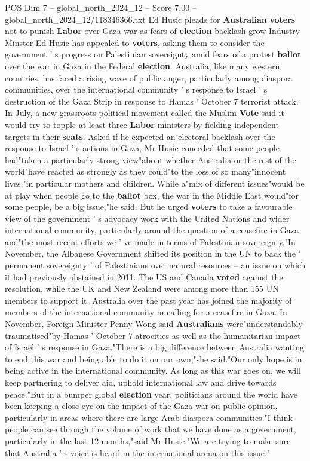 \begin{textsample}{POS Dim 7 – global\_north\_2024\_12 – Score 7.00 – global\_north\_2024\_12/118346366.txt}  \label{ex:f7_pos_290}
Ed Husic pleads for \textbf{Australian} \textbf{voters} not to punish \textbf{Labor} over Gaza war as fears of \textbf{election} backlash grow Industry Minster Ed Husic has appealed to \textbf{voters}, asking them to consider the government ' s progress on Palestinian sovereignty amid fears of a protest \textbf{ballot} over the war in Gaza in the Federal \textbf{election}.
Australia, like many western countries, has faced a rising wave of public anger, particularly among diaspora communities, over the international community ' s response to Israel ' s destruction of the Gaza Strip in response to Hamas ' October 7 terrorist attack.
In July, a new grassroots political movement called the Muslim \textbf{Vote} said it would try to topple at least three \textbf{Labor} ministers by fielding independent targets in their \textbf{seats}.
Asked if he expected an electoral backlash over the response to Israel ' s actions in Gaza, Mr Husic conceded that some people had"taken a particularly strong view"about whether Australia or the rest of the world"have reacted as strongly as they could"to the loss of so many"innocent lives,"in particular mothers and children.
While a"mix of different issues"would be at play when people go to the \textbf{ballot} box, the war in the Middle East would"for some people, be a big issue,"he said.
But he urged \textbf{voters} to take a favourable view of the government ' s advocacy work with the United Nations and wider international community, particularly around the question of a ceasefire in Gaza and"the most recent efforts we ' ve made in terms of Palestinian sovereignty."In November, the Albanese Government shifted its position in the UN to back the ' permanent sovereignty ' of Palestinians over natural resources -- an issue on which it had previously abstained in 2011.
The US and Canada \textbf{voted} against the resolution, while the UK and New Zealand were among more than 155 UN members to support it.
Australia over the past year has joined the majority of members of the international community in calling for a ceasefire in Gaza.
In November, Foreign Minister Penny Wong said \textbf{Australians} were"understandably traumatised"by Hamas ' October 7 atrocities as well as the humanitarian impact of Israel ' s response in Gaza."There is a big difference between Australia wanting to end this war and being able to do it on our own,"she said."Our only hope is in being active in the international community.
As long as this war goes on, we will keep partnering to deliver aid, uphold international law and drive towards peace."But in a bumper global \textbf{election} year, politicians around the world have been keeping a close eye on the impact of the Gaza war on public opinion, particularly in areas where there are large Arab diaspora communities."I think people can see through the volume of work that we have done as a government, particularly in the last 12 months,"said Mr Husic."We are trying to make sure that Australia ' s voice is heard in the international arena on this issue."

\end{textsample}
